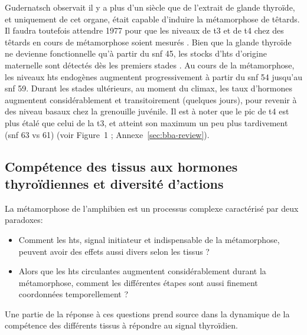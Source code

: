 \documentclass[../main.tex]{subfiles}
\begin{document}
Gudernatsch observait il y a plus d'un siècle que de l'extrait de glande thyroïde, et uniquement de cet organe, était capable d'induire la métamorphose de têtards.
Il faudra toutefois attendre 1977 pour que les niveaux de \gls{t3} et de \gls{t4} chez des têtards en cours de métamorphose soient mesurés \citep{Leloup1977}.
Bien que la glande thyroïde ne devienne fonctionnelle qu'à partir du \gls{snf} 45, les stocks d'\glspl{ht} d'origine maternelle sont détectés dès les premiers stades \citep{MorvanDubois2006}.
Au cours de la métamorphose, les niveaux \glspl{ht} endogènes augmentent progressivement à partir du \gls{snf} 54 jusqu'au \gls{snf} 59.
Durant les stades ultérieurs, au moment du climax, les taux d'hormones augmentent considérablement et transitoirement (quelques jours), pour revenir à des niveau basaux chez la grenouille juvénile.
Il est à noter que le pic de \gls{t4} est plus étalé que celui de la \gls{t3}, et atteint son maximum un peu plus tardivement (\gls{snf} 63 vs 61) (voir Figure~1 \citealp{Grimaldi2012}; Annexe~\ref{sec:bba-review}).


\subsection{Compétence des tissus aux hormones thyroïdiennes et diversité d'actions}\label{tissue-compet-ht}

La métamorphose de l'amphibien est un processus complexe caractérisé par deux paradoxes:
\begin{itemize}
\item Comment les \glspl{ht}, signal initiateur et indispensable de la métamorphose, peuvent avoir des effets aussi divers selon les tissus ? 
\item Alors que les \glspl{ht} circulantes augmentent considérablement durant la métamorphose, comment les différentes étapes sont aussi finement coordonnées temporellement ?
\end{itemize}
\par
Une partie de la réponse à ces questions prend source dans la dynamique de la compétence des différents tissus à répondre au signal thyroïdien.
\end{document}
